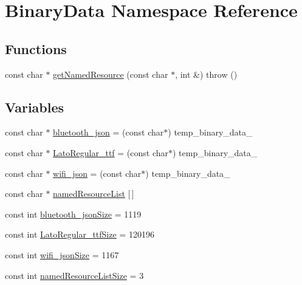 \hypertarget{namespaceBinaryData}{}\section{Binary\+Data Namespace Reference}
\label{namespaceBinaryData}
\subsection*{Functions}
\begin{DoxyCompactItemize}
\item 
const char $\ast$ \mbox{\hyperlink{namespaceBinaryData_acad4631c320eed7847f28f60d88d18bb}{get\+Named\+Resource}} (const char $\ast$, int \&)  throw ()
\end{DoxyCompactItemize}
\subsection*{Variables}
\begin{DoxyCompactItemize}
\item 
const char $\ast$ \mbox{\hyperlink{namespaceBinaryData_afe64975be1e98220742c9c857a4213e4}{bluetooth\+\_\+json}} = (const char$\ast$) temp\+\_\+binary\+\_\+data\+\_
\item 
const char $\ast$ \mbox{\hyperlink{namespaceBinaryData_aecb798453ebb30348b392aa8301f4103}{Lato\+Regular\+\_\+ttf}} = (const char$\ast$) temp\+\_\+binary\+\_\+data\+\_
\item 
const char $\ast$ \mbox{\hyperlink{namespaceBinaryData_a72aa1073c893ca2868c3bae5e803e68b}{wifi\+\_\+json}} = (const char$\ast$) temp\+\_\+binary\+\_\+data\+\_
\item 
const char $\ast$ \mbox{\hyperlink{namespaceBinaryData_a051bed02cbcf8b4696f6a3cbb73bc5b7}{named\+Resource\+List}} \mbox{[}$\,$\mbox{]}
\item 
const int \mbox{\hyperlink{namespaceBinaryData_ac03b09be7e82f3f9f0131105c8493f0e}{bluetooth\+\_\+json\+Size}} = 1119
\item 
const int \mbox{\hyperlink{namespaceBinaryData_ab560d82cfdd99bef59d82b0521ceb6b6}{Lato\+Regular\+\_\+ttf\+Size}} = 120196
\item 
const int \mbox{\hyperlink{namespaceBinaryData_a7bf5b74a25a25cc39e2f0ce38fa8a2dd}{wifi\+\_\+json\+Size}} = 1167
\item 
const int \mbox{\hyperlink{namespaceBinaryData_aecc8c4a47b7a1df12d868be0a81ad67b}{named\+Resource\+List\+Size}} = 3
\end{DoxyCompactItemize}


